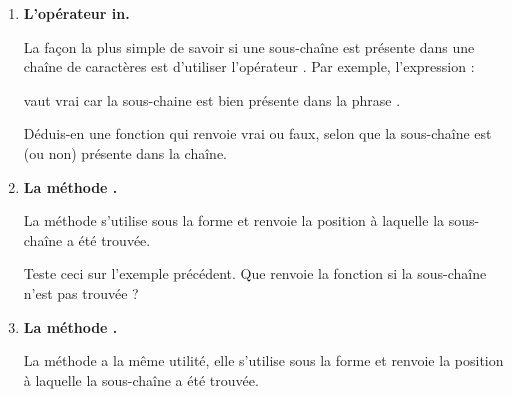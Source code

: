 \documentclass[11pt,class=report,crop=false]{standalone}
\begin{document}





\begin{activite}[Chercher]


\begin{enumerate}
  \item \textbf{L'opérateur \og{}in\fg{}.}
  
  
  La façon la plus simple de savoir si une sous-chaîne est présente dans une chaîne de caractères est d'utiliser l'opérateur \og{}\fg{}. Par exemple, l'expression :\\
  \centerline{}
  vaut \og{}vrai\fg{} car la sous-chaine  est bien présente dans la phrase
  . 
  
  Déduis-en une fonction  qui renvoie \og{}vrai\fg{} ou \og{}faux\fg{}, selon que la sous-chaîne est (ou non) présente dans la chaîne.
  
  \item \textbf{La méthode .}
  
  
  La méthode  s'utilise sous la forme  et renvoie la position à laquelle la sous-chaîne a été trouvée. 
  
  Teste ceci sur l'exemple précédent. Que renvoie la fonction si la sous-chaîne n'est pas trouvée ?
 
   \item \textbf{La méthode .}
  
  
  La méthode  a la même utilité, elle s'utilise sous la forme  et renvoie la position à laquelle la sous-chaîne a été trouvée. 


\end{enumerate}
\end{activite}
\end{document}
